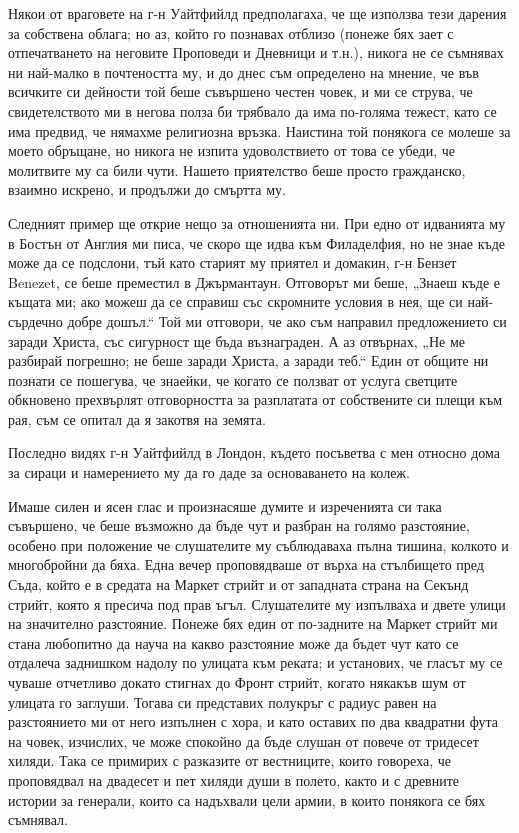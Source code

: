 \documentclass[12pt]{book}
\begin{document}
Някои от враговете на г-н Уайтфийлд предполагаха, че ще използва тези дарения за собствена облага; но аз, който го познавах отблизо (понеже бях зает с отпечатването на неговите Проповеди и Дневници и т.н.), никога не се съмнявах ни най-малко в почтеността му, и до днес съм определено на мнение, че във всичките си дейности той беше съвършено честен човек, и ми се струва, че свидетелството ми в негова полза би трябвало да има по-голяма тежест, като се има предвид, че нямахме религиозна връзка. Наистина той понякога се молеше за моето обръщане, но никога не изпита удоволствието от това се убеди, че молитвите му са били чути. Нашето приятелство беше просто гражданско, взаимно искрено, и продължи до смъртта му.

Следният пример ще открие нещо за отношенията ни. При едно от идванията му в Бостън от Англия ми писа, че скоро ще идва към Филаделфия, но не знае къде може да се подслони, тъй като старият му приятел и домакин, г-н Бензет Benezet, се беше преместил в Джърмантаун. Отговорът ми беше, „Знаеш къде е къщата ми; ако можеш да се справиш със скромните условия в нея, ще си най-сърдечно добре дошъл.“ Той ми отговори, че ако съм направил предложението си заради Христа, със сигурност ще бъда възнаграден. А аз отвърнах, „Не ме разбирай погрешно; не беше заради Христа, а заради теб.“ Един от общите ни познати се пошегува, че знаейки, че когато се ползват от услуга светците обкновено прехвърлят отговорността за разплатата от собствените си плещи към рая, съм се опитал да я закотвя на земята.

Последно видях г-н Уайтфийлд в Лондон, където посъветва с мен относно дома за сираци и намерението му да го даде за основаването на колеж. 

Имаше силен и ясен глас и произнасяше думите и изреченията си така съвършено, че беше възможно да бъде чут и разбран на голямо разстояние, особено при положение че слушателите му съблюдаваха пълна тишина, колкото и многобройни да бяха. Една вечер проповядваше от върха на стълбището пред Съда, който е в средата на Маркет стрийт и от западната страна на Секънд стрийт, която я пресича под прав ъгъл. Слушателите му изпълваха и двете улици на значително разстояние. Понеже бях един от по-задните на Маркет стрийт ми стана любопитно да науча на какво разстояние може да бъдет чут като се отдалеча заднишком надолу по улицата към реката; и установих, че гласът му се чуваше отчетливо докато стигнах до Фронт стрийт, когато някакъв шум от улицата го заглуши. Тогава си представих полукръг с радиус равен на разстоянието ми от него изпълнен с хора, и като оставих по два квадратни фута на човек, изчислих, че може спокойно да бъде слушан от повече от тридесет хиляди. Така се примирих с разказите от вестниците, които говореха, че проповядвал на двадесет и пет хиляди души в полето, както и с древните истории за генерали, които са надъхвали цели армии, в които понякога се бях съмнявал.
\end{document}
